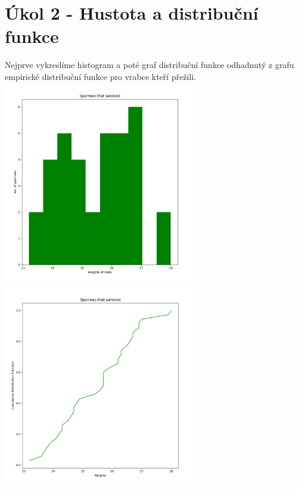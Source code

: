 \documentclass[12pt,a4paper]{article}
\begin{document}
\section{Úkol 2 - Hustota a distribuční funkce}
Nejprve vykreslíme histogram a poté graf distribuční funkce odhadnutý z grafu empirické distribuční funkce pro vrabce kteří přežili.\\
\includegraphics[height=3.5in]{survivedHist}
\includegraphics[height=3.5in]{survivedDist}

\pagebreak
\end{document}
